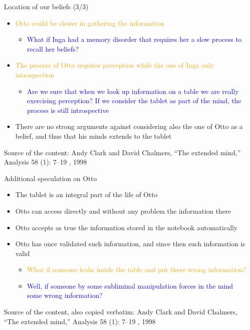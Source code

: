 \documentclass{beamer}
\begin{document}
\begin{frame}
{\centerline{Location of our beliefs (3/3)}}
\begin{itemize}
\item  \textcolor{orange}{Otto could be slower in gathering the information}
  \begin{itemize}
    \item \textcolor{blue}{What if Inga had a memory disorder that requires her a slow process to recall her beliefs?}
\end{itemize} 
\item  \textcolor{orange}{The process of Otto requires perception while the one of Inga only introspection}
  \begin{itemize}
    \item \textcolor{blue}{Are we sure that when we look up information on a table we are really exercising perception? If we consider the tablet as part of the mind, the process is still introspective}
\end{itemize} 
\item There are no strong arguments against considering also the one of Otto as a belief, and thus that his minds extends to the tablet
\end{itemize} 

\begin{center}
    \tiny{Source of the content: Andy Clark and David Chalmers, ``The extended mind,'' Analysis 58 (1): 7--19 , 1998}
\end{center}

\end{frame}

\begin{frame}
{\centerline{Additional speculation on Otto}}
\begin{itemize}
\item The tablet is an integral part of the life of Otto
\item Otto can access directly and without any problem the information there
\item Otto accepts as true the information stored in the notebook automatically
\item Otto has once validated such information, and since then such information is valid
\begin{itemize}
\item \textcolor{orange}{What if someone leaks inside the table and put there wrong information?}
\item \textcolor{blue}{Well, if someone by some subliminal manipulation forces in the mind some wrong information?}
\end{itemize} 
\end{itemize} 


\begin{center}
    \tiny{Source of the content, also copied verbatim: Andy Clark and David Chalmers, ``The extended mind,'' Analysis 58 (1): 7--19 , 1998}
\end{center}

\end{frame}
\end{document}
